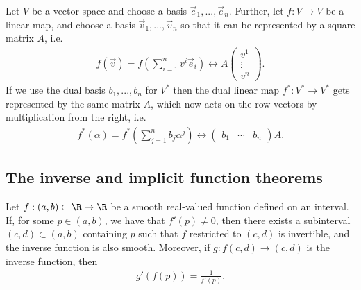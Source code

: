 \documentclass{article}
\begin{document}
\begin{lemma}
    Let $V$ be a vector space and choose a basis $\vec e_1,...,\vec e_n$. Further, let $f:V\to V$
    be a linear map, and choose a basis $\vec v_1, ...,\vec v_n$ so that it can be represented 
    by a square matrix $A$, i.e. 
    \begin{align*}
        f(\vec v) = f\left(\sum_{i=1}^n v^i \vec e_i\right) \longleftrightarrow A\begin{pmatrix}
            v^1\\\vdots\\v^n
        \end{pmatrix}.
    \end{align*}
    If we use the dual basis $b_1,...,b_n$ for $V^*$ then the dual linear map $f^*:V^*\to V^*$ gets represented
    by the same matrix $A$, which now acts on the row-vectors by multiplication from the right, i.e.
    \begin{align*}
        f^*(\alpha) = f^*\left(\sum_{j=1}^n b_j\alpha^j\right)\longleftrightarrow \begin{pmatrix}
            b_1 & \cdots & b_n
        \end{pmatrix}A.
    \end{align*}
\end{lemma}

\subsection{The inverse and implicit function theorems}

\begin{theorem}
    Let $f:(a,b)\subset \R \to \R$ be a smooth real-valued function defined on an 
    interval. If, for some $p\in(a,b)$, we have that $f'(p)\not=0$, then there exists
    a subinterval $(c,d)\subset(a,b)$ containing $p$ such that $f$ restricted to $(c,d)$
    is invertible, and the inverse function is also smooth. Moreover, if
    $g:f(c,d)\to(c,d)$ is the inverse function, then
    \begin{align*}
        g'(f(p))=\frac{1}{f'(p)}.
    \end{align*} 
\end{theorem}
\end{document}

